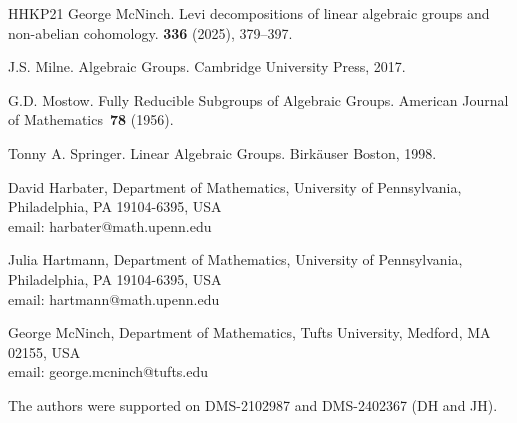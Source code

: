 \documentclass[12pt]{amsart}
\theoremstyle{plain}
\theoremstyle{definition}
\theoremstyle{remark}
\begin{document}
\begin{thebibliography}{HHKP21}
George McNinch.
\newblock Levi decompositions of linear algebraic groups and non-abelian cohomology.
 {\bf 336} (2025), 379--397.

J.S. Milne. 
\newblock Algebraic Groups.
\newblock Cambridge University Press, 2017. 


G.D. Mostow.
\newblock Fully Reducible Subgroups of Algebraic Groups.
\newblock American Journal of Mathematics~{\bf 78} (1956).

Tonny A. Springer.
\newblock Linear Algebraic Groups.
\newblock Birk\"auser Boston, 1998.

\end{thebibliography}

\bigskip


\medskip

\noindent David Harbater, 
Department of Mathematics, University of Pennsylvania, Philadelphia, PA 19104-6395, USA\\
email: harbater@math.upenn.edu

\medskip

\noindent Julia Hartmann, 
Department of Mathematics, University of Pennsylvania, Philadelphia, PA 19104-6395, USA\\
email: hartmann@math.upenn.edu

\medskip

\noindent George McNinch,
Department of Mathematics, Tufts University, Medford, MA 02155, USA\\
email: george.mcninch@tufts.edu

\medskip

\noindent The authors were supported on DMS-2102987 and DMS-2402367 (DH and JH).
\end{document}
